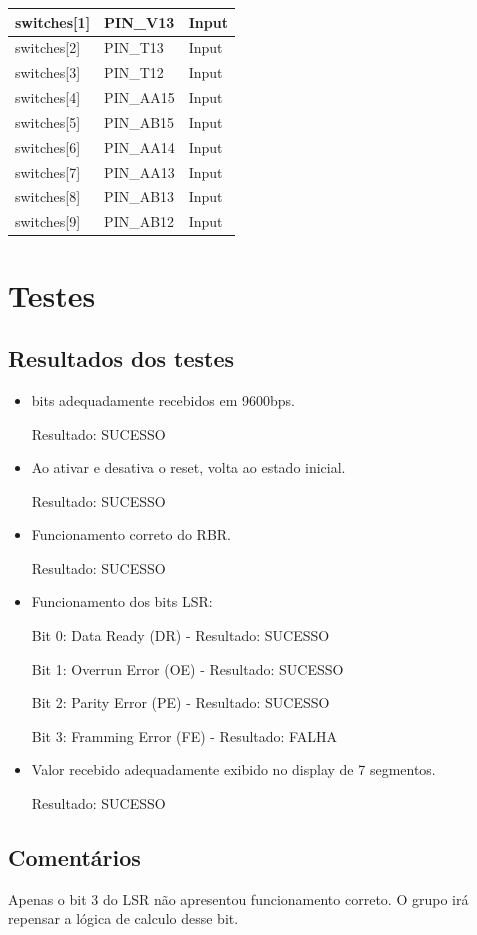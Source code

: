 \documentclass[12pt, a4paper]{article}
\begin{document}
\begin{table}[H]
\begin{center}
\begin{tabular}{|l|l|l|}
				switches{[}1{]}    & PIN\_V13  & Input  \\ \hline
				switches{[}2{]}    & PIN\_T13  & Input  \\ \hline
				switches{[}3{]}    & PIN\_T12  & Input  \\ \hline
				switches{[}4{]}    & PIN\_AA15 & Input  \\ \hline
				switches{[}5{]}    & PIN\_AB15 & Input  \\ \hline
				switches{[}6{]}    & PIN\_AA14 & Input  \\ \hline
				switches{[}7{]}    & PIN\_AA13 & Input  \\ \hline
				switches{[}8{]}    & PIN\_AB13 & Input  \\ \hline
				switches{[}9{]}    & PIN\_AB12 & Input  \\ \hline
			\end{tabular}
		\end{center}
	\end{table}
	
	
	
	\section*{Testes}
	
	\subsection*{Resultados dos testes}

	\begin{itemize}
		\item bits adequadamente recebidos em 9600bps.
		\par Resultado: SUCESSO
		
		\item Ao ativar e desativa o reset, volta ao estado inicial. 
		\par Resultado:  SUCESSO
		
		\item Funcionamento correto do RBR.
		\par Resultado:  SUCESSO
		
		\item Funcionamento dos bits LSR:
		
		\subitem Bit 0: Data Ready (DR) - Resultado:  SUCESSO
		
		\subitem Bit 1: Overrun Error (OE) - Resultado:  SUCESSO
		
		\subitem Bit 2: Parity Error (PE) - Resultado:  SUCESSO
		
		\subitem Bit 3: Framming Error (FE) - Resultado: FALHA
		
		\item Valor recebido adequadamente exibido no display de 7 segmentos.
		\par Resultado:  SUCESSO
		
	\end{itemize}
	
	\subsection*{Comentários}
		Apenas o bit 3 do LSR não apresentou funcionamento correto. O grupo irá repensar a lógica de
		calculo desse bit.
	
	
\end{document}
